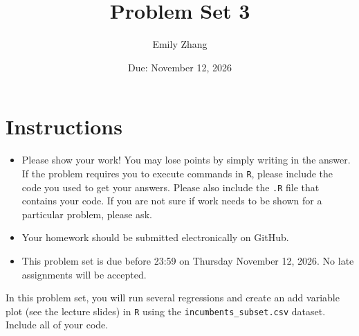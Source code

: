 \documentclass[12pt,letterpaper]{article}
\title{Problem Set 3}
\date{Due: November 12, 2026}
\author{Emily Zhang}
\begin{document}
	\maketitle
	\section*{Instructions}
	\begin{itemize}
		\item Please show your work! You may lose points by simply writing in the answer. If the problem requires you to execute commands in \texttt{R}, please include the code you used to get your answers. Please also include the \texttt{.R} file that contains your code. If you are not sure if work needs to be shown for a particular problem, please ask.
	\item Your homework should be submitted electronically on GitHub.
	\item This problem set is due before 23:59 on Thursday November 12, 2026. No late assignments will be accepted.

	\end{itemize}

		\vspace{.25cm}
	
\noindent In this problem set, you will run several regressions and create an add variable plot (see the lecture slides) in \texttt{R} using the \texttt{incumbents\_subset.csv} dataset. Include all of your code.

\vspace{0.5cm}
	
\end{document}
